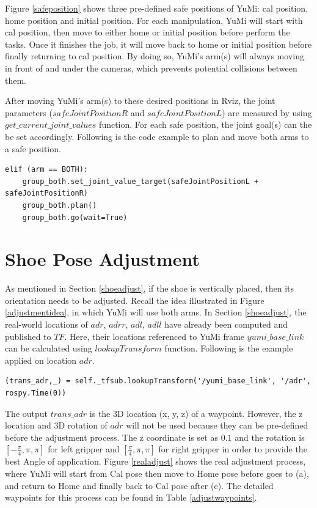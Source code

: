 Figure \ref{safeposition} shows three pre-defined safe positions of YuMi: cal position, home position and initial position. For each manipulation, YuMi will start with cal position, then move to either home or initial position before perform the tasks. Once it finishes the job, it will move back to home or initial position before finally returning to cal position. By doing so, YuMi's arm(s) will always moving in front of and under the cameras, which prevents potential collisions between them.

After moving YuMi's arm(s) to these desired positions in Rviz, the joint parameters ($safeJointPositionR$ and $safeJointPositionL$) are measured by using $get\_current\_joint\_values$ function. For each safe position, the joint goal(s) can the be set accordingly. Following is the code example to plan and move both arms to a safe position.

\begin{verbatim}
elif (arm == BOTH):
    group_both.set_joint_value_target(safeJointPositionL + safeJointPositionR)
    group_both.plan()
    group_both.go(wait=True)
\end{verbatim}

\section{Shoe Pose Adjustment} \label{adj}
As mentioned in Section \ref{shoeadjust}, if the shoe is vertically placed, then its orientation needs to be adjusted. Recall the idea illustrated in Figure \ref{adjustmentidea}, in which YuMi will use both arms. In Section \ref{shoeadjust}, the real-world locations of $adr$, $adrr$, $adl$, $adll$ have already been computed and published to $TF$.
Here, their locations referenced to YuMi frame $yumi\_base\_link$ can be calculated using $lookupTransform$ function. Following is the example applied on location $adr$.

\begin{verbatim}
(trans_adr,_) = self._tfsub.lookupTransform('/yumi_base_link', '/adr', rospy.Time(0))
\end{verbatim}

The output $trans\_adr$ is the 3D location (x, y, z) of a waypoint. However, the z location and 3D rotation of $adr$ will not be used because they can be pre-defined before the adjustment process. The z coordinate is set as $0.1$ and the rotation is $[-\frac{\pi}{4}, \pi, \pi]$ for left gripper and $[\frac{\pi}{4}, \pi, \pi]$ for right gripper in order to provide the best Angle of application. Figure \ref{realadjust} shows the real adjustment process, where YuMi will start from Cal pose then move to Home pose before goes to (a), and return to Home and finally back to Cal pose after (e). The detailed waypoints for this process can be found in Table \ref{adjustwaypoints}.

